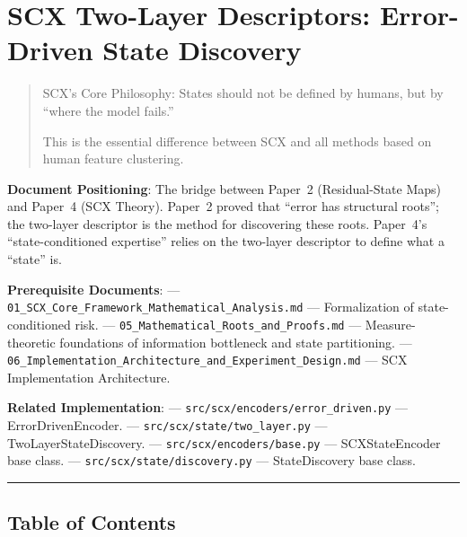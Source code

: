 \documentclass[
  12pt,
]{article}
\author{SCX}
\date{2026}
\begin{document}
\section{SCX Two-Layer Descriptors: Error-Driven State Discovery}\label{scx-two-layer-descriptors-error-driven-state-discovery}

\begin{quote}
SCX's Core Philosophy: States should not be defined by humans, but by ``where the model fails.''

This is the essential difference between SCX and all methods based on human feature clustering.
\end{quote}

\textbf{Document Positioning}: The bridge between Paper~2 (Residual-State Maps) and Paper~4 (SCX Theory). Paper~2 proved that ``error has structural roots''; the two-layer descriptor is the method for discovering these roots. Paper~4's ``state-conditioned expertise'' relies on the two-layer descriptor to define what a ``state'' is.

\textbf{Prerequisite Documents}: --- \texttt{01\_SCX\_Core\_Framework\_Mathematical\_Analysis.md} --- Formalization of state-conditioned risk. --- \texttt{05\_Mathematical\_Roots\_and\_Proofs.md} --- Measure-theoretic foundations of information bottleneck and state partitioning. --- \texttt{06\_Implementation\_Architecture\_and\_Experiment\_Design.md} --- SCX Implementation Architecture.

\textbf{Related Implementation}: --- \texttt{src/scx/encoders/error\_driven.py} --- ErrorDrivenEncoder. --- \texttt{src/scx/state/two\_layer.py} --- TwoLayerStateDiscovery. --- \texttt{src/scx/encoders/base.py} --- SCXStateEncoder base class. --- \texttt{src/scx/state/discovery.py} --- StateDiscovery base class.

\begin{center}\rule{0.5\linewidth}{0.5pt}\end{center}

\subsection{Table of Contents}\label{table-of-contents}
\end{document}
